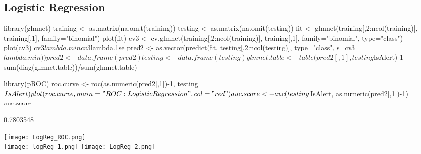 \documentclass[11pt]{article}
\begin{document}
\subsection{Logistic Regression}
\begin{Schunk}
\begin{Sinput}
library(glmnet)
training <- as.matrix(na.omit(training))
testing <- as.matrix(na.omit(testing))
fit <- glmnet(training[,2:ncol(training)], training[,1], family="binomial")
plot(fit)
cv3 <- cv.glmnet(training[,2:ncol(training)], training[,1], family="binomial", type="class")
plot(cv3)
cv3$lambda.min
cv3$lambda.1se
pred2 <- as.vector(predict(fit, testing[,2:ncol(testing)], type="class", s=cv3$lambda.min))
pred2 <- data.frame(pred2)
testing <- data.frame(testing)
glmnet.table <- table(pred2[,1], testing$IsAlert)
1-sum(diag(glmnet.table))/sum(glmnet.table)

library(pROC)
roc.curve <- roc(as.numeric(pred2[,1])-1, testing$IsAlert)
plot(roc.curve, main = "ROC: Logistic Regression", col = "red")
auc.score<-auc(testing$IsAlert, as.numeric(pred2[,1])-1)
auc.score
\end{Sinput}
\begin{Soutput}
[1] 0.7803548
\end{Soutput}
\end{Schunk}

\texttt{[image: LogReg\_ROC.png]} \\
\texttt{[image: logReg\_1.png]}
\texttt{[image: LogReg\_2.png]}

\end{document}

